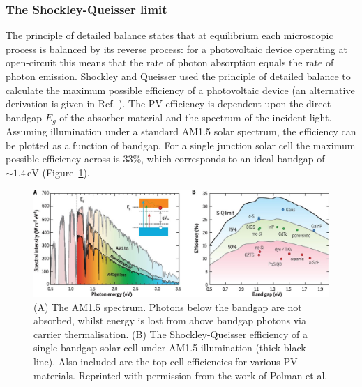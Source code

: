 \subsubsection{The Shockley-Queisser limit}\label{sec:SQlimit}
The principle of detailed balance states that at equilibrium each microscopic process is balanced by its reverse process: for a photovoltaic device operating at open-circuit this means that the rate of photon absorption equals the rate of photon emission. Shockley and Queisser used the principle of detailed balance to calculate the maximum possible efficiency of a photovoltaic device\autocite{Shockley1961} (an alternative derivation is given in Ref. \cite{Nelson2003}). The PV efficiency is dependent upon the direct bandgap $E_g$ of the absorber material and the spectrum of the incident light. Assuming illumination under a standard AM1.5 solar spectrum, the efficiency can be plotted as a function of bandgap. For a single junction solar cell the maximum possible efficiency across is 33\%, which corresponds to an ideal bandgap of $\sim 1.4\,\text{eV}$ (Figure\ \ref{SQlimit}). 

\begin{figure}[h]
\centering
   \includegraphics[width=1.0\columnwidth]{figures/ch1/SQlimit.jpg}
   \caption[AM1.5 spectral intensity and Shockley-Queisser efficiency]{(A) The AM1.5 spectrum. Photons below the bandgap are not absorbed, whilst energy is lost from above bandgap photons via carrier thermalisation. (B) The Shockley-Queisser efficiency of a single bandgap solar cell under AM1.5 illumination (thick black line). Also included are the top cell efficiencies for various PV materials. Reprinted with permission from the work of Polman et al.\autocite{Polman2016}}
   \label{SQlimit}
\end{figure}

